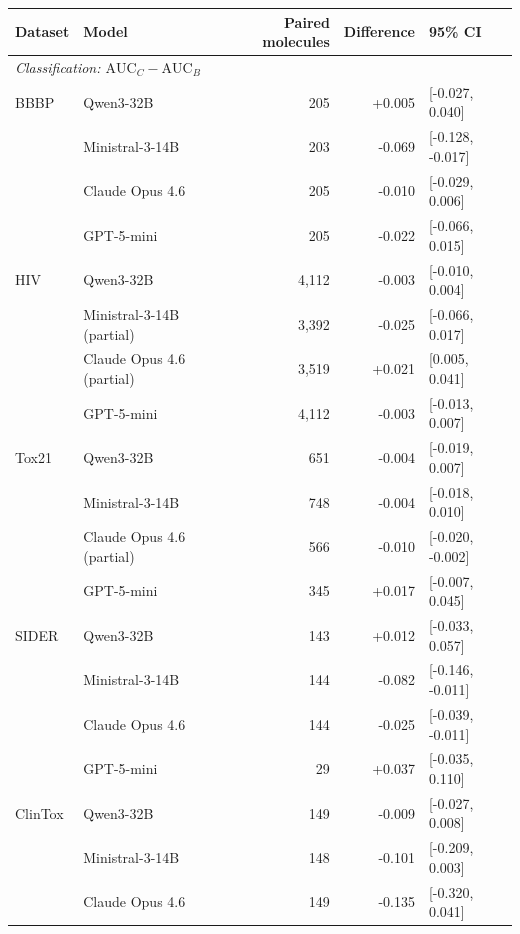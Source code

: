 \begin{table}[t]
\centering
\small
\begin{tabular}{llrrl}
\toprule
\textbf{Dataset} & \textbf{Model} & \textbf{Paired molecules} & \textbf{Difference} & \textbf{95\% CI} \\
\midrule
\multicolumn{5}{l}{\textit{Classification: $\mathrm{AUC}_{C}-\mathrm{AUC}_{B}$}} \\
\addlinespace
BBBP  & Qwen3-32B                  & 205 & +0.005 & [-0.027, 0.040] \\
      & Ministral-3-14B            & 203 & -0.069 & [-0.128, -0.017] \\
      & Claude Opus 4.6            & 205 & -0.010 & [-0.029, 0.006] \\
      & GPT-5-mini                 & 205 & -0.022 & [-0.066, 0.015] \\
\addlinespace
HIV   & Qwen3-32B                  & 4,112 & -0.003 & [-0.010, 0.004] \\
      & Ministral-3-14B (partial)  & 3,392 & -0.025 & [-0.066, 0.017] \\
      & Claude Opus 4.6 (partial)  & 3,519 & +0.021 & [0.005, 0.041] \\
      & GPT-5-mini                 & 4,112 & -0.003 & [-0.013, 0.007] \\
\addlinespace
Tox21 & Qwen3-32B                  & 651 & -0.004 & [-0.019, 0.007] \\
      & Ministral-3-14B            & 748 & -0.004 & [-0.018, 0.010] \\
      & Claude Opus 4.6 (partial)  & 566 & -0.010 & [-0.020, -0.002] \\
      & GPT-5-mini                 & 345 & +0.017 & [-0.007, 0.045] \\
\addlinespace
SIDER & Qwen3-32B                  & 143 & +0.012 & [-0.033, 0.057] \\
      & Ministral-3-14B            & 144 & -0.082 & [-0.146, -0.011] \\
      & Claude Opus 4.6            & 144 & -0.025 & [-0.039, -0.011] \\
      & GPT-5-mini                 & 29 & +0.037 & [-0.035, 0.110] \\
\addlinespace
ClinTox & Qwen3-32B                  & 149 & -0.009 & [-0.027, 0.008] \\
      & Ministral-3-14B            & 148 & -0.101 & [-0.209, 0.003] \\
      & Claude Opus 4.6            & 149 & -0.135 & [-0.320, 0.041] \\

\end{tabular}
\end{table}

